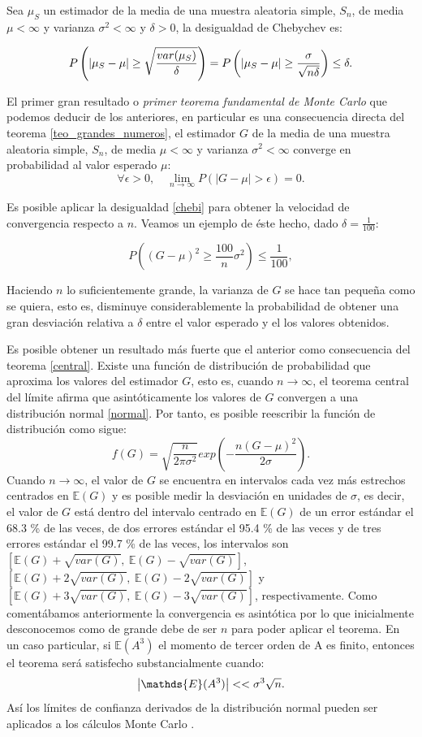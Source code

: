\documentclass[../proyecto.tex]{memoir}
\begin{document}
\begin{defi} \label{chebi}
Sea $\mu_S$ un estimador de la media de una muestra aleatoria simple, $S_n$, de media $\mu < \infty$ y varianza $\sigma^2  < \infty$ y $\delta>0$, la desigualdad de Chebychev es:

$$
P \left( \abs{\mu_S-\mu} \geq \sqrt{\frac{var(\mu_S)}{\delta}} \right) = P \left( \abs{\mu_S-\mu} \geq \frac{\sigma}{\sqrt{n\delta}} \right)  \leq \delta.
$$

\end{defi}

El primer gran resultado o \textit{primer teorema fundamental de Monte Carlo} que podemos deducir de los anteriores, en particular es una consecuencia directa del teorema \ref{teo_grandes_numeros}, el estimador $G$ de la media de una muestra aleatoria simple, $S_n$, de media $\mu < \infty$ y varianza $\sigma^2 < \infty$ converge en probabilidad al valor esperado $\mu$:
$$
\forall \epsilon > 0,\quad \lim_{n\to\infty} P( |G - \mu|> \epsilon ) = 0.
$$

Es posible aplicar la desigualdad \ref{chebi} para obtener la velocidad de convergencia respecto a $n$. Veamos un ejemplo de éste hecho, dado $\delta=\frac{1}{100}$:

$$
P \left( ( G - \mu )^2 \geq \frac{100}{n} \sigma^2 \right)  \leq \frac{1}{100},
$$

Haciendo $n$ lo suficientemente grande, la varianza de $G$ se hace tan pequeña como se quiera, esto es, disminuye considerablemente la probabilidad de obtener una gran desviación relativa a $\delta$ entre el valor esperado y el los valores obtenidos.

Es posible obtener un resultado más fuerte que el anterior como consecuencia  del teorema \ref{central}. Existe una función de distribución de probabilidad que aproxima los valores del estimador $G$, esto es, cuando $n \to\infty$, el teorema central del límite afirma que asintóticamente los valores de $G$ convergen a una distribución normal \ref{normal}. Por tanto, es posible reescribir la función de distribución como sigue:
$$
f(G) = \sqrt{\frac{n}{2 \pi \sigma^2}} exp \left( - \frac{n(G-\mu)^2}{2\sigma} \right).
$$
Cuando $n \to\infty$, el valor de $G$ se encuentra en intervalos cada vez más estrechos centrados en $\mathds{E}(G)$ y es posible medir la desviación en unidades de $\sigma$, es decir, el valor de $G$ está dentro del intervalo centrado en $\mathds{E}(G)$ de un error estándar el 68.3 \% de las veces, de dos errores estándar el 95.4 \% de las veces y de tres errores estándar el 99.7 \%  de las veces, los intervalos son $[\mathds{E}(G)+\sqrt{var(G)},\ \mathds{E}(G)-\sqrt{var(G)}]$, $[\mathds{E}(G)+2\sqrt{var(G)},\ \mathds{E}(G)-2\sqrt{var(G)}]$ y $[\mathds{E}(G)+3\sqrt{var(G)},\ \mathds{E}(G)-3\sqrt{var(G)}]$, respectivamente. Como comentábamos anteriormente la convergencia es asintótica por lo que inicialmente desconocemos como de grande debe de ser $n$ para poder aplicar el teorema. En un caso particular, si $\mathds{E}(A^3)$ el momento de tercer orden de A es finito, entonces el teorema será satisfecho substancialmente cuando:
$$
\abs{\mathds{E}(A^3)} << \sigma^3 \sqrt{n}.
$$
Así los límites de confianza derivados de la distribución normal pueden ser aplicados a los cálculos Monte Carlo \cite{fundamentos_montecarlo}.
\end{document}
